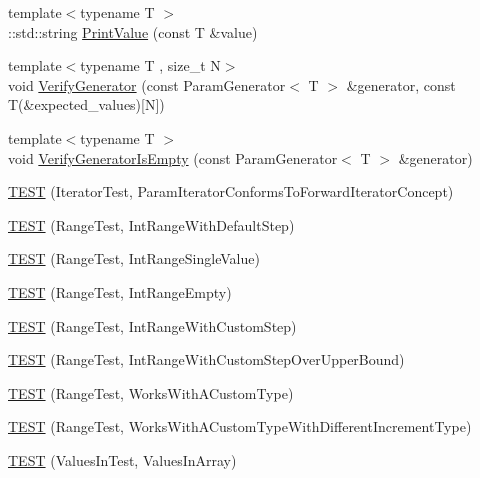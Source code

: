 \begin{DoxyCompactItemize}
\item 
{\footnotesize template$<$typename T $>$ }\\\+::std\+::string \mbox{\hyperlink{googletest-param-test-test_8cc_a4f874f103b3979e50bc676c7f6414dfc}{Print\+Value}} (const T \&value)
\item 
{\footnotesize template$<$typename T , size\+\_\+t N$>$ }\\void \mbox{\hyperlink{googletest-param-test-test_8cc_a11c99cfbf44746868aa44105130887f7}{Verify\+Generator}} (const Param\+Generator$<$ T $>$ \&generator, const T(\&expected\+\_\+values)\mbox{[}N\mbox{]})
\item 
{\footnotesize template$<$typename T $>$ }\\void \mbox{\hyperlink{googletest-param-test-test_8cc_a85d74de6e554738555812410476b4eec}{Verify\+Generator\+Is\+Empty}} (const Param\+Generator$<$ T $>$ \&generator)
\item 
\mbox{\hyperlink{googletest-param-test-test_8cc_a884488b4ac035aaa0e1f799243479538}{T\+E\+ST}} (Iterator\+Test, Param\+Iterator\+Conforms\+To\+Forward\+Iterator\+Concept)
\item 
\mbox{\hyperlink{googletest-param-test-test_8cc_aa1294eff6c7aea20468f93a70e6b157d}{T\+E\+ST}} (Range\+Test, Int\+Range\+With\+Default\+Step)
\item 
\mbox{\hyperlink{googletest-param-test-test_8cc_acce71b74b2d6f3c2d456e37fd62769a9}{T\+E\+ST}} (Range\+Test, Int\+Range\+Single\+Value)
\item 
\mbox{\hyperlink{googletest-param-test-test_8cc_a905a71adae7909d42426aa13b7da5ede}{T\+E\+ST}} (Range\+Test, Int\+Range\+Empty)
\item 
\mbox{\hyperlink{googletest-param-test-test_8cc_a806821fc992661b6da02005f57482fd8}{T\+E\+ST}} (Range\+Test, Int\+Range\+With\+Custom\+Step)
\item 
\mbox{\hyperlink{googletest-param-test-test_8cc_a87b9e66f957ddc505fc81cb14fd72339}{T\+E\+ST}} (Range\+Test, Int\+Range\+With\+Custom\+Step\+Over\+Upper\+Bound)
\item 
\mbox{\hyperlink{googletest-param-test-test_8cc_ae3c8adabec91bd63fd719e116c279eac}{T\+E\+ST}} (Range\+Test, Works\+With\+A\+Custom\+Type)
\item 
\mbox{\hyperlink{googletest-param-test-test_8cc_a88be7527c7d77f3c89f80d84c80fd405}{T\+E\+ST}} (Range\+Test, Works\+With\+A\+Custom\+Type\+With\+Different\+Increment\+Type)
\item 
\mbox{\hyperlink{googletest-param-test-test_8cc_abfcf3f3f6fcd742e3e85daf552f02b40}{T\+E\+ST}} (Values\+In\+Test, Values\+In\+Array)

\end{DoxyCompactItemize}
